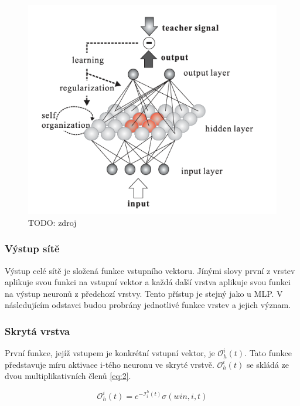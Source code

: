 \documentclass[thesis=M,czech]{FITthesis}[2012/06/26]
\begin{document}
\begin{figure}[htbp]
\begin{center}
	\includegraphics[scale=0.6]{crsom_structure}
\caption{TODO: zdroj}
\label{fig:crsom_structure}
\end{center}
\end{figure}
 
 

\subsubsection*{Výstup sítě}
Výstup celé sítě je složená funkce vstupního vektoru. 
Jínými slovy první z vrstev aplikuje svou funkci na vstupní vektor a každá další vrstva aplikuje svou funkci na výstup neuronů z předchozí vrstvy. Tento přístup je stejný jako u MLP. V následujícím odstavci budou probrány jednotlivé funkce vrstev a jejich význam.

\subsubsection*{Skrytá vrstva}
První funkce, jejíž vstupem je konkrétní vstupní vektor, je $ \mathcal{O}_h^i(t) $. Tato funkce představuje míru aktivace i-tého neuronu ve skryté vrstvě. $ \mathcal{O}_h^i(t) $ se skládá ze dvou multiplikativních členů \ref{eq:2}.

\begin{equation} \label{eq:2}
    \mathcal{O}_h^i(t) = e^{-\mathcal{I}_i^h(t)} \sigma(win, i, t)
\end{equation}
\end{document}
